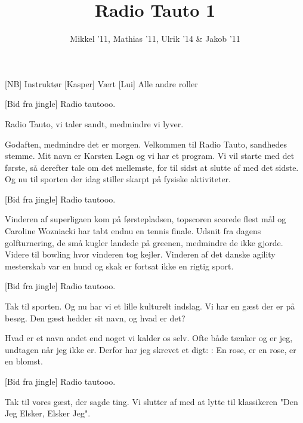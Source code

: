 \documentclass[a4paper,11pt]{article}
\title{Radio Tauto 1}
\author{Mikkel '11, Mathias '11, Ulrik '14 \& Jakob '11}
\begin{document}
\maketitle

\begin{roles}
[NB] Instruktør
[Kasper] Vært
[Lui] Alle andre roller
\end{roles}

\begin{sketch}

[Bid fra jingle] Radio tautooo.

 Radio Tauto, vi taler sandt, medmindre vi lyver.

 Godaften, medmindre det er morgen. Velkommen til Radio Tauto, sandhedes stemme. Mit navn er Karsten Løgn og vi har et program. Vi vil starte med det første, så derefter tale om det mellemste, for til sidst at slutte af med det sidste. Og nu til sporten der idag stiller skarpt på fysiske aktiviteter.

[Bid fra jingle] Radio tautooo.

 Vinderen af superligaen kom på førstepladsen, topscoren scorede flest mål og Caroline Wozniacki har tabt endnu en tennis finale.  Udsnit fra dagens golfturnering, de små kugler landede på greenen, medmindre de ikke gjorde. Videre til bowling hvor vinderen tog kejler. Vinderen af det danske agility mesterskab var en hund og skak er fortsat ikke en rigtig sport. %

[Bid fra jingle] Radio tautooo.

 Tak til sporten. Og nu har vi et lille kulturelt indslag. Vi har en gæst der er på besøg. Den gæst hedder sit navn, og hvad er det?

 Hvad er et navn andet end noget vi kalder os selv. Ofte både tænker og er jeg, undtagen når jeg ikke er. Derfor har jeg skrevet et digt: : En rose, er en rose, er en blomst.

[Bid fra jingle] Radio tautooo.

 Tak til vores gæst, der sagde ting. Vi slutter af med at lytte til klassikeren "Den Jeg Elsker, Elsker Jeg".


\end{sketch}
\end{document}

